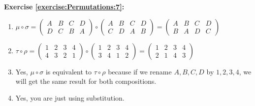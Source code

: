 \noindent\textbf{Exercise \ref{exercise:Permutations:7}:}
\begin{enumerate}[{a.}]
\item
$\mu\circ\sigma=\begin{pmatrix}
A & B & C & D\\
D & C & B & A
\end{pmatrix}\circ\begin{pmatrix}
A & B & C & D\\
C & D & A & B
\end{pmatrix}=\begin{pmatrix}
A & B & C & D\\
B & A & D & C
\end{pmatrix}$

\item
$\tau\circ\rho=\begin{pmatrix}
1 & 2 & 3 & 4\\
4 & 3 & 2 & 1
\end{pmatrix}\circ\begin{pmatrix}
1 & 2 & 3 & 4\\
3 & 4 & 1 & 2
\end{pmatrix}=\begin{pmatrix}
1 & 2 & 3 & 4\\
2 & 1 & 4 & 3
\end{pmatrix}$

\item
Yes, $\mu\circ\sigma$ is equivalent to $\tau\circ\rho$ because if we rename $A, B, C, D$ by $1, 2, 3, 4$, we will get the same result for both compositions.

\item
Yes, you are just using substitution.
\end{enumerate}

